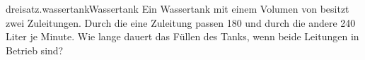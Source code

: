 \begin{exercise}{dreisatz.wassertank}{Wassertank}
  \ifproblem\problem
    Ein Wassertank mit einem Volumen von  besitzt zwei Zuleitungen.
    Durch die eine Zuleitung passen 180 und durch die andere 240 Liter je Minute.
    Wie lange dauert das Füllen des Tanks, wenn beide Leitungen in Betrieb
    sind?
  \fi
\end{exercise}
